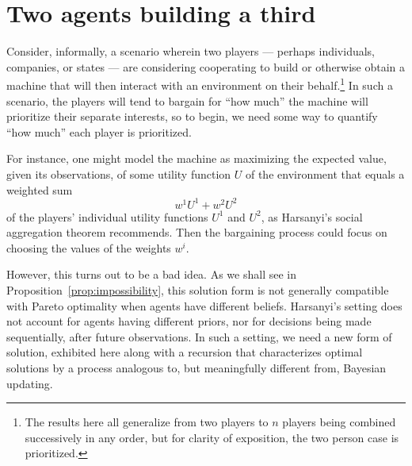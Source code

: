 \documentclass{article}  %
\newcommand{\bred}[1]{{\color{red}{#1}}}
\newcommand{\prop}[1]{Proposition~\ref{prop:#1}}
\begin{document}
\section{Two agents building a third}

Consider, informally, a scenario wherein two players --- perhaps individuals, companies, or states --- are considering cooperating to build or otherwise obtain a machine that will then interact with an environment on their behalf.\footnote{The results here all generalize from two players to $n$ players being combined successively in any order, but for clarity of exposition, the two person case is prioritized.} In such a scenario, the players will tend to bargain for ``how much'' the machine will prioritize their separate interests, so to begin, we need some way to quantify ``how much'' each player is prioritized.

For instance, one might model the machine as maximizing the expected value, given its observations, of some utility function $U$ of the environment that equals a weighted sum 
\begin{equation}\label{eqn:harsanyi}
w^1U^1 + w^2U^2
\end{equation}
of the players' individual utility functions $U^1$ and $U^2$, as Harsanyi's social aggregation theorem \citep{harsanyi1980cardinal} recommends.  Then the bargaining process could focus on choosing the values of the weights $w^i$.  

However, this turns out to be a bad idea.  As we shall see in \prop{impossibility}, this solution form is not generally compatible with Pareto optimality when agents have different beliefs.  Harsanyi's setting does not account for agents having different priors, nor for decisions being made sequentially, after future observations.  In such a setting, we need a new form of solution, exhibited here along with a recursion that characterizes optimal solutions by a process analogous to, but meaningfully different from, Bayesian updating.
\end{document}
